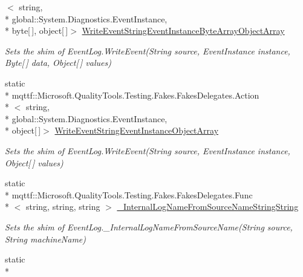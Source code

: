 \begin{DoxyCompactItemize}
$<$ string, \\*
global\-::\-System.\-Diagnostics.\-Event\-Instance, \\*
byte\mbox{[}$\,$\mbox{]}, object\mbox{[}$\,$\mbox{]}$>$ \hyperlink{class_system_1_1_diagnostics_1_1_fakes_1_1_shim_event_log_af4b51bdd657289bc2ec2ed8a95cf446a}{Write\-Event\-String\-Event\-Instance\-Byte\-Array\-Object\-Array}
\begin{DoxyCompactList}\small\item\em Sets the shim of Event\-Log.\-Write\-Event(\-String source, Event\-Instance instance, Byte\mbox{[}$\,$\mbox{]} data, Object\mbox{[}$\,$\mbox{]} values)\end{DoxyCompactList}\item 
static \\*
mqttf\-::\-Microsoft.\-Quality\-Tools.\-Testing.\-Fakes.\-Fakes\-Delegates.\-Action\\*
$<$ string, \\*
global\-::\-System.\-Diagnostics.\-Event\-Instance, \\*
object\mbox{[}$\,$\mbox{]}$>$ \hyperlink{class_system_1_1_diagnostics_1_1_fakes_1_1_shim_event_log_aceaacc0e3f8d06243fa1b3867adac881}{Write\-Event\-String\-Event\-Instance\-Object\-Array}
\begin{DoxyCompactList}\small\item\em Sets the shim of Event\-Log.\-Write\-Event(\-String source, Event\-Instance instance, Object\mbox{[}$\,$\mbox{]} values)\end{DoxyCompactList}\item 
static \\*
mqttf\-::\-Microsoft.\-Quality\-Tools.\-Testing.\-Fakes.\-Fakes\-Delegates.\-Func\\*
$<$ string, string, string $>$ \hyperlink{class_system_1_1_diagnostics_1_1_fakes_1_1_shim_event_log_a2b8467ef0d737cbcff2853dad8894be4}{\-\_\-\-Internal\-Log\-Name\-From\-Source\-Name\-String\-String}
\begin{DoxyCompactList}\small\item\em Sets the shim of Event\-Log.\-\_\-\-Internal\-Log\-Name\-From\-Source\-Name(\-String source, String machine\-Name)\end{DoxyCompactList}\item 
static \\*

\end{DoxyCompactItemize}
